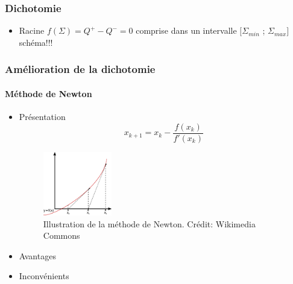 \documentclass[french]{beamer}
\begin{document}

\begin{frame}
\frametitle{Dichotomie}

   \begin{itemize}
      \item Racine $f(\Sigma) = Q^+ - Q^- = 0$ comprise dans un intervalle $[\Sigma_{min}$ ; $\Sigma_{max}]$
      \\
      schéma!!!
   \end{itemize}
\end{frame}


\begin{frame}
\frametitle{Amélioration de la dichotomie}
\framesubtitle{Méthode de Newton}

   \begin{itemize}
      \item Présentation
      \\
      \begin{equation}
         x_{k+1} = x_k - \frac{f(x_k)}{f'(x_k)}
      \end{equation}

      \begin{figure}[htb!]
         \includegraphics[width=3cm]{figures/Newton_method.png}
         \caption{Illustration de la méthode de Newton. Crédit: Wikimedia Commons}
      \end{figure}
      
      \item Avantages
      \item Inconvénients
   \end{itemize}
\end{frame}

\end{document}
